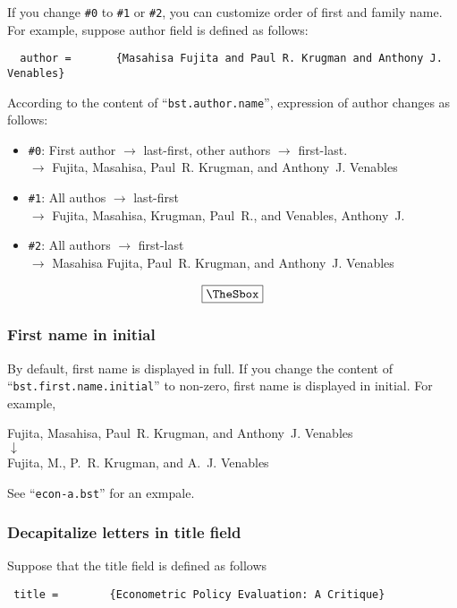 \documentclass[10pt]{article}
\newenvironment{Frame}%
{\setlength{\fboxsep}{15pt}
\setlength{\mylength}{\linewidth}%
\addtolength{\mylength}{-2\fboxsep}%
\addtolength{\mylength}{-2\fboxrule}%
\Sbox
\minipage{\mylength}%
\setlength{\abovedisplayskip}{0pt}%
\setlength{\belowdisplayskip}{0pt}%
}%
{\endminipage\endSbox
\[\fbox{\TheSbox}\]}
\begin{document}
If you change \verb|#0| to \verb|#1| or \verb|#2|, you can customize
order of first and family name.  For example, suppose author field is
defined as follows:
\begin{verbatim}
  author =       {Masahisa Fujita and Paul R. Krugman and Anthony J. Venables}
\end{verbatim}

According to the content of ``\texttt{bst.author.name}'', expression of
author changes as follows:
\begin{Frame}
\begin{itemize}
 \item \verb|#0|: First author $\rightarrow$ last-first, other authors
       $\rightarrow$ first-last.\\
       $\rightarrow$ Fujita, Masahisa, Paul~R. Krugman, and
       Anthony~J. Venables
 \item \verb|#1|: All authos $\rightarrow$ last-first \\
       $\rightarrow$ Fujita, Masahisa, Krugman, Paul~R., and Venables, Anthony~J.
 \item \verb|#2|: All authors $\rightarrow$ first-last \\
       $\rightarrow$ Masahisa Fujita, Paul~R. Krugman, and Anthony~J. Venables
\end{itemize}
\end{Frame}

\subsubsection{First name in initial}

By default, first name is displayed in full.  If you change the content
of ``\texttt{bst.first.name.initial}'' to non-zero, first name is displayed
in initial.  For example,
\begin{center}
Fujita, Masahisa, Paul~R. Krugman, and Anthony~J. Venables \\
 $\downarrow$ \\
Fujita, M., P.~R. Krugman, and A.~J. Venables
\end{center}

See ``\texttt{econ-a.bst}'' for an exmpale.

\subsubsection{Decapitalize letters in title field}

Suppose that the title field is defined as follows
\begin{center}
  \verb| title =        {Econometric Policy Evaluation: A Critique}|
\end{center}
\end{document}
